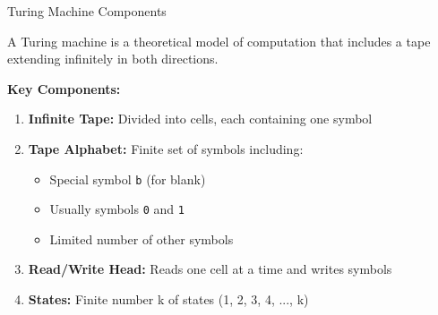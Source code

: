 \documentclass[aspectratio=169]{beamer}
\begin{document}
\begin{frame}{Turing Machine Components}
    \begin{definition}
        A Turing machine is a theoretical model of computation that includes a tape extending infinitely in both directions.
    \end{definition}
    
    \vspace{0.5cm}
    \textbf{Key Components:}
    \begin{enumerate}
        \item \textbf{Infinite Tape:} Divided into cells, each containing one symbol
        \item \textbf{Tape Alphabet:} Finite set of symbols including:
        \begin{itemize}
            \item Special symbol \texttt{b} (for blank)
            \item Usually symbols \texttt{0} and \texttt{1}
            \item Limited number of other symbols
        \end{itemize}
        \item \textbf{Read/Write Head:} Reads one cell at a time and writes symbols
        \item \textbf{States:} Finite number k of states (1, 2, 3, 4, ..., k)
    \end{enumerate}
\end{frame}
\end{document}
